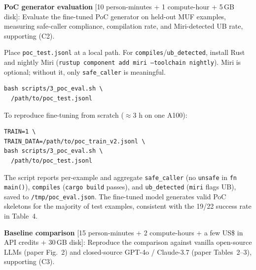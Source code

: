 \documentclass[nonacm,sigconf]{acmart}
\begin{document}
\begin{compactitem}
\item[(E3):]
  \textbf{PoC generator evaluation}
  [10 person-minutes + 1 compute-hour + 5\,GB disk]:
  Evaluate the fine-tuned PoC generator on held-out MUF examples,
  measuring safe-caller compliance, compilation rate, and
  Miri-detected UB rate, supporting (C2).

  \begin{asparadesc}
  \item[Preparation:] Place \texttt{poc\_test.jsonl} at a local path.
        For \texttt{compiles}/\texttt{ub\_detected}, install Rust and
        nightly Miri (\texttt{rustup component add miri --toolchain nightly}).
        Miri is optional; without it, only \texttt{safe\_caller} is
        meaningful.
  \item[Execution:]
\begin{verbatim}
bash scripts/3_poc_eval.sh \
  /path/to/poc_test.jsonl
\end{verbatim}
        To reproduce fine-tuning from scratch ($\approx$3 h on one A100):
\begin{verbatim}
TRAIN=1 \
TRAIN_DATA=/path/to/poc_train_v2.jsonl \
bash scripts/3_poc_eval.sh \
  /path/to/poc_test.jsonl
\end{verbatim}
  \item[Results:] The script reports per-example and aggregate
        \texttt{safe\_caller} (no \texttt{unsafe} in \texttt{fn main()}),
        \texttt{compiles} (\texttt{cargo build} passes), and
        \texttt{ub\_detected} (\texttt{miri} flags UB), saved to
        \texttt{/tmp/poc\_eval.json}. The fine-tuned model generates
        valid PoC skeletons for the majority of test examples,
        consistent with the 19/22 success rate in Table~4.
  \end{asparadesc}

\item[(E4):]
  \textbf{Baseline comparison}
  [15 person-minutes + 2 compute-hours + a few US\$ in API credits + 30\,GB
  disk]: Reproduce the comparison against vanilla open-source LLMs
  (paper Fig.~2) and closed-source GPT-4o / Claude-3.7 (paper
  Tables~2--3), supporting (C3).


\end{compactitem}
\end{document}
